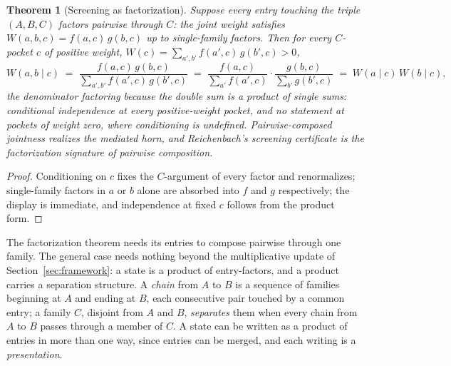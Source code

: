 \documentclass[11pt]{article}
\newtheorem{theorem}{Theorem}
\begin{document}
\begin{theorem}[Screening as factorization]
\label{thm:factorization}
Suppose every entry touching the triple $(A, B, C)$ factors pairwise through $C$: the joint weight satisfies $W(a,b,c) = f(a,c)\, g(b,c)$ up to single-family factors. Then for every $C$-pocket $c$ of positive weight, $W(c) = \sum_{a', b'} f(a', c)\, g(b', c) > 0$,
\begin{equation}
\label{eq:factorization}
W(a, b \mid c) \;=\; \frac{f(a,c)\, g(b,c)}{\sum_{a', b'} f(a',c)\, g(b',c)} \;=\; \frac{f(a,c)}{\sum_{a'} f(a',c)} \cdot \frac{g(b,c)}{\sum_{b'} g(b',c)} \;=\; W(a \mid c)\, W(b \mid c),
\end{equation}
the denominator factoring because the double sum is a product of single sums: conditional independence at every positive-weight pocket, and no statement at pockets of weight zero, where conditioning is undefined. Pairwise-composed jointness realizes the mediated horn, and Reichenbach's screening certificate is the factorization signature of pairwise composition.
\end{theorem}

\begin{proof}
Conditioning on $c$ fixes the $C$-argument of every factor and renormalizes; single-family factors in $a$ or $b$ alone are absorbed into $f$ and $g$ respectively; the display is immediate, and independence at fixed $c$ follows from the product form.
\end{proof}

The factorization theorem needs its entries to compose pairwise through one family. The general case needs nothing beyond the multiplicative update of Section~\ref{sec:framework}: a state is a product of entry-factors, and a product carries a separation structure. A \emph{chain} from $A$ to $B$ is a sequence of families beginning at $A$ and ending at $B$, each consecutive pair touched by a common entry; a family $C$, disjoint from $A$ and $B$, \emph{separates} them when every chain from $A$ to $B$ passes through a member of $C$. A state can be written as a product of entries in more than one way, since entries can be merged, and each writing is a \emph{presentation}.
\end{document}
